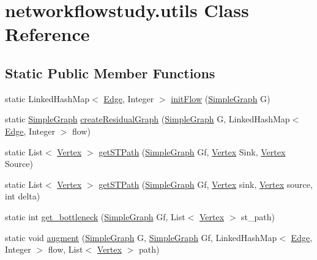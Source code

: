 \hypertarget{classnetworkflowstudy_1_1utils}{}\section{networkflowstudy.\+utils Class Reference}
\label{classnetworkflowstudy_1_1utils}
\subsection*{Static Public Member Functions}
\begin{DoxyCompactItemize}
\item 
static Linked\+Hash\+Map$<$ \hyperlink{classgraphCode_1_1Edge}{Edge}, Integer $>$ \hyperlink{classnetworkflowstudy_1_1utils_adb62dd1157cf528552b71e94e870a011}{init\+Flow} (\hyperlink{classgraphCode_1_1SimpleGraph}{Simple\+Graph} G)
\item 
static \hyperlink{classgraphCode_1_1SimpleGraph}{Simple\+Graph} \hyperlink{classnetworkflowstudy_1_1utils_a3f8e81e0a22357b097aa9d4b29f55c38}{create\+Residual\+Graph} (\hyperlink{classgraphCode_1_1SimpleGraph}{Simple\+Graph} G, Linked\+Hash\+Map$<$ \hyperlink{classgraphCode_1_1Edge}{Edge}, Integer $>$ flow)
\item 
static List$<$ \hyperlink{classgraphCode_1_1Vertex}{Vertex} $>$ \hyperlink{classnetworkflowstudy_1_1utils_a3e79182192feaaf3a165ea76dc7f67f1}{get\+S\+T\+Path} (\hyperlink{classgraphCode_1_1SimpleGraph}{Simple\+Graph} Gf, \hyperlink{classgraphCode_1_1Vertex}{Vertex} Sink, \hyperlink{classgraphCode_1_1Vertex}{Vertex} Source)
\item 
static List$<$ \hyperlink{classgraphCode_1_1Vertex}{Vertex} $>$ \hyperlink{classnetworkflowstudy_1_1utils_a808f3b008f9d0d7393ebc3b8c1720e09}{get\+S\+T\+Path} (\hyperlink{classgraphCode_1_1SimpleGraph}{Simple\+Graph} Gf, \hyperlink{classgraphCode_1_1Vertex}{Vertex} sink, \hyperlink{classgraphCode_1_1Vertex}{Vertex} source, int delta)
\item 
static int \hyperlink{classnetworkflowstudy_1_1utils_ab5edf71767668d4f1a1b2a8f713d4d12}{get\+\_\+bottleneck} (\hyperlink{classgraphCode_1_1SimpleGraph}{Simple\+Graph} Gf, List$<$ \hyperlink{classgraphCode_1_1Vertex}{Vertex} $>$ st\+\_\+path)
\item 
static void \hyperlink{classnetworkflowstudy_1_1utils_a8b78a7103f79ad968453d38e7429cedb}{augment} (\hyperlink{classgraphCode_1_1SimpleGraph}{Simple\+Graph} G, \hyperlink{classgraphCode_1_1SimpleGraph}{Simple\+Graph} Gf, Linked\+Hash\+Map$<$ \hyperlink{classgraphCode_1_1Edge}{Edge}, Integer $>$ flow, List$<$ \hyperlink{classgraphCode_1_1Vertex}{Vertex} $>$ path)
\end{DoxyCompactItemize}


